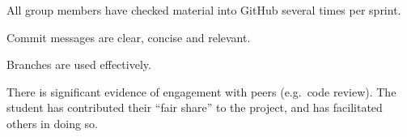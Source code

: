 \documentclass{../fal_assignment}
\begin{document}
\begin{markingrubric}
        \grade All group members have checked material into GitHub several times per sprint.
            \par Commit messages are clear, concise and relevant.
            \par Branches are used effectively.
            \par There is significant evidence of engagement with peers (e.g.\ code review).
%
        \grade The student has contributed their ``fair share'' to the project,
            and has facilitated others in doing so.
\end{markingrubric}
\end{document}
